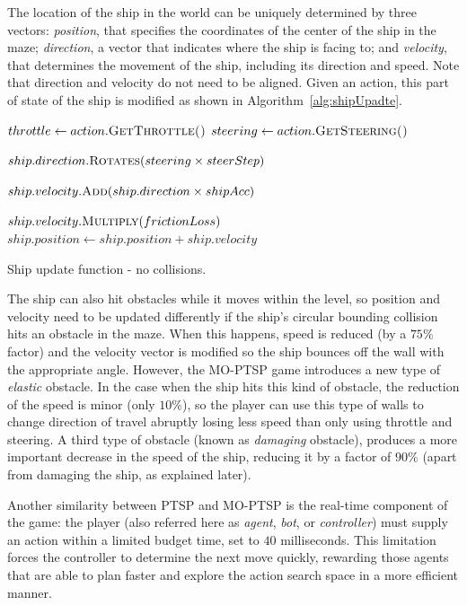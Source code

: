 \documentclass[conference]{IEEEtran}
\begin{document}
The location of the ship in the world can be uniquely determined by three vectors: \textit{position}, that specifies the coordinates of the center of the ship in the maze; \textit{direction}, a vector that indicates where the ship is facing to; and \textit{velocity}, that determines the movement of the ship, including its direction and speed. Note that direction and velocity do not need to be aligned. Given an action, this part of state of the ship is modified as shown in Algorithm~\ref{alg:shipUpadte}.

\begin{algorithm}[!h]
\begin{algorithmic}
	\State $throttle \gets action.\Call{GetThrottle()}{}$
	\State $steering \gets action.\Call{GetSteering()}{}$

	\State $ship.direction.\Call{Rotates}{steering \times steerStep}$

		\State $ship.velocity.\Call{Add}{ship.direction \times shipAcc}$
	\EndIf

	\State $ship.velocity.\Call{Multiply}{frictionLoss}$
	\State $ship.position \gets ship.position + ship.velocity$


\EndFunction
\end{algorithmic}
\caption{Ship update function - no collisions.}
\label{alg:shipUpadte}
\end{algorithm}

The ship can also hit obstacles while it moves within the level, so position and velocity need to be updated differently if the ship's circular bounding collision hits an obstacle in the maze. When this happens, speed is reduced (by a $75\%$ factor) and the velocity vector is modified so the ship bounces off the wall with the appropriate angle. However, the MO-PTSP game introduces a new type of \textit{elastic} obstacle. In the case when the ship hits this kind of obstacle, the reduction of the speed is minor (only $10\%$), so the player can use this type of walls to change direction of travel abruptly losing less speed than only using throttle and steering. A third type of obstacle (known as \textit{damaging} obstacle), produces a more important decrease in the speed of the ship, reducing it by a factor of $90\%$ (apart from damaging the ship, as explained later).

Another similarity between PTSP and MO-PTSP is the real-time component of the game: the player (also referred here as \textit{agent}, \textit{bot}, or \textit{controller}) must supply an action within a limited budget time, set to $40$ milliseconds. This limitation forces the controller to determine the next move quickly, rewarding those agents that are able to plan faster and explore the action search space in a more efficient manner.
\end{document}
